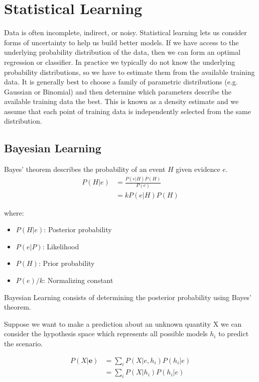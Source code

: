 \documentclass[12pt]{article}
\begin{document}
\section{Statistical Learning}
    Data is often incomplete, indirect, or noisy. Statistical learning lets us consider forms of uncertainty to help us build better models. If we have access to the underlying probability distribution of the data, then we can form 
    an optimal regression or classifier. In practice we typically do not know the underlying probability distributions, so we have to estimate them from the available training data. It is generally best to choose a family of parametric
    distributions (e.g. Gaussian or Binomial) and then determine which parameters describe the available training data the best. This is known as a density estimate and we assume that each point of training data is independently selected
    from the same distribution.

    \subsection{Bayesian Learning}
    Bayes' theorem describes the probability of an event $H$ given evidence $e$.
    \begin{align}
        P(H|e) &= \frac{P(e|H)P(H)}{P(e)} \\
        &= kP(e|H)P(H)
    \end{align}

    where:
    \begin{itemize}
        \item $P(H|e)$: Posterior probability
        \item $P(e|P)$: Likelihood
        \item $P(H)$: Prior probability
        \item $P(e)/k$: Normalizing constant
    \end{itemize}

    Bayesian Learning consists of determining the posterior probability using Bayes' theorem.
    
    Suppose we want to make a prediction about an unknown quantity X we can consider the hypothesis space which represents all possible models $h_i$ to predict the scenario.

    \begin{align}
        P(X|\boldsymbol{e}) &= \sum_i P(X|e, h_i)P(h_i|e) \\
        &= \sum_i P(X|h_i)P(h_i|e)
    \end{align}
\end{document}
